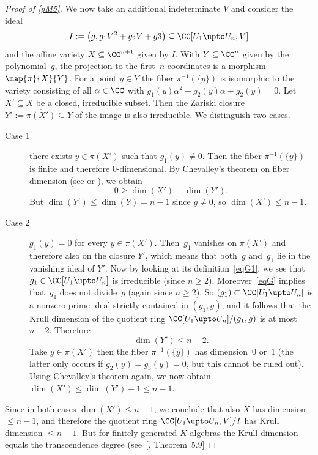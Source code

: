 \documentclass[reqno]{amsart}
\begin{document}
\begin{proof}[Proof of \cref{pM5}]
  We now take an additional indeterminate $V$ and consider the ideal
  \[
    I := \bigl(g,g_1 V^2 + g_2 V + g3\bigr) \subseteq \CC[U_1 \upto
    U_n,V]
  \]
  and the affine variety $X \subseteq \CC^{n+1}$ given by $I$. With
  $Y \subseteq \CC^n$ given by the polynomial~$g$, the projection to
  the first~$n$ coordinates is a morphism $\map{\pi}{X}{Y}$. For a
  point $y \in Y$ the fiber $\pi^{-1}(\{y\})$ is isomorphic to the
  variety consisting of all $\alpha \in \CC$ with
  $g_1(y) \alpha^2 + g_2(y) \alpha + g_2(y) = 0$. Let $X' \subseteq X$
  be a closed, irreducible subset. Then the Zariski closure
  $Y' := \overline{\pi(X')} \subseteq Y$ of the image is also
  irreducible. We distinguish two cases.
  \begin{description}
  \item[Case 1] there exists $y \in \pi(X')$ such that $g_1(y) \ne
    0$. Then the fiber $\pi^{-1}(\{y\})$ is finite and therefore
    $0$-dimensional. By Chevalley's theorem on fiber dimension (see
     or ), we obtain
    \[
      0 \ge \dim(X') - \dim(Y').
    \]
    But $\dim(Y') \le \dim(Y) = n-1$ since $g \ne 0$, so
    $\dim(X') \le n-1$.
  \item[Case 2] $g_1(y) = 0$ for every $y \in \pi(X')$. Then~$g_1$
    vanishes on $\pi(X')$ and therefore also on the closure $Y'$,
    which means that both~$g$ and~$g_1$ lie in the vanishing ideal of
    $Y'$. Now by looking at its definition~\eqref{eqG1}, we see that
    $g_1 \in \CC[U_1 \upto U_n]$ is irreducible (since $n \ge
    2$). Moreover~\eqref{eqG} implies that~$g_1$ does not divide~$g$
    (again since $n \ge 2$). So $(g_1) \subset \CC[U_1 \upto U_n]$ is
    a nonzero prime ideal strictly contained in $(g_1,g)$, and it
    follows that the Krull dimension of the quotient ring
    $\CC[U_1 \upto U_n]/(g_1,g)$ is at most $n - 2$. Therefore
    \[
      \dim(Y') \le n-2.
    \]
    Take $y \in \pi(X')$ then the fiber $\pi^{-1}(\{y\})$ has
    dimension~$0$ or~$1$ (the latter only occurs if
    $g_2(y) = g_3(y) = 0$, but this cannot be ruled out). Using
    Chevalley's theorem again, we now obtain
    $\dim(X') \le \dim(Y') + 1 \le n - 1$.
  \end{description}
  Since in both cases $\dim(X') \le n-1$, we conclude that also $X$
  has dimension $\le n-1$, and therefore the quotient ring
  $\CC[U_1 \upto U_n,V]/I$ has Krull dimension $\le n-1$. But for
  finitely generated $K$-algebras the Krull dimension equals the
  transcendence degree (see~[, Theorem~5.9]

\end{proof}
\end{document}
